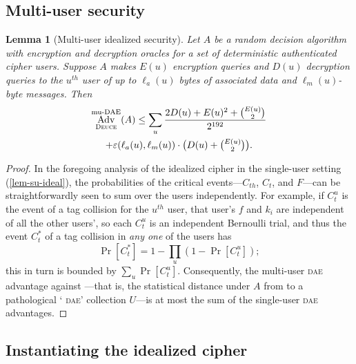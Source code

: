 \documentclass[draft]{article}
\newtheorem{lemma}{Lemma}
\def\operatorsc#1{{%
  \ifmmode\let\next=\operatorname\else\let\next=\relax\fi\next{\textsc{#1}}}}
\def\Deuce/{\operatorsc{Deuce}}
\def\DAE{%
  \ifmmode\def\next{\operatorname{DAE}}%
    \else\def\next/{\textsc{dae}}%
  \fi\next}
\def\muDAE{%
  \ifmmode\def\next{\operatorname{mu-DAE}}%
    \else\def\next/{mu-\textsc{dae}}%
  \fi\next}
\DeclareMathOperator{\Adv}{Adv}
\newcommand{\collisionbound}{\varepsilon}
\begin{document}
\subsection{Multi-user security}

\begin{lemma}[Multi-user idealized security]\label{lem-mu-ideal}
  Let $A$ be a random decision algorithm with encryption and
   decryption oracles for a \emph{set} of deterministic authenticated
   cipher users.
  Suppose $A$ makes $E(u)$ encryption queries and $D(u)$ decryption
   queries to the $u^{\mathit{th}}$ user of up to $\ell_a(u)$ bytes of
   associated data and $\ell_m(u)$-byte messages.
  Then
%
  \begin{multline*}
    \Adv^{\muDAE}_{\Deuce/}(A)
    \leq \sum_u \frac{2 D(u) + E(u)^2 + \binom{E(u)}{2}}
                     {2^{192}} \\
           + \collisionbound(\ell_a(u), \ell_m(u))
             \cdot
             {\textstyle\bigl(D(u) + \binom{E(u)}{2}\bigr)}.
  \end{multline*}
\end{lemma}

\begin{proof}
  In the foregoing analysis of the idealized cipher \Deuce/ in the
   single-user setting (\autoref{lem-su-ideal}), the probabilities of
   the critical events---$C_{th}$, $C_t$, and $F$---can be
   straightforwardly seen to sum over the users independently.
  For example, if $C_t^u$ is the event of a tag collision for the
   $u^{\mathit{th}}$ user, that user's $f$ and $k_i$ are independent of
   all the other users', so each $C_t^u$ is an independent Bernoulli
   trial, and thus the event $C_t^*$ of a tag collision in
   \emph{any one} of the users has
  \[
    \Pr[C_t^*] = 1 - \prod_u (1 - \Pr[C_t^u]);
  \]
   this in turn is bounded by $\sum_u \Pr[C_t^u]$.
  Consequently, the multi-user \DAE/ advantage against \Deuce/---that
   is, the statistical distance under $A$ from \Deuce/ to a
   pathological `\DAE/' collection $U$---is at most the sum of the
   single-user \DAE/ advantages.
\end{proof}

\subsection{Instantiating the idealized cipher}
\end{document}
